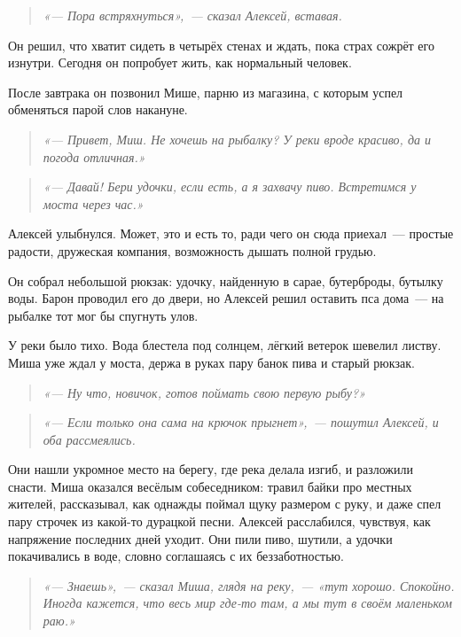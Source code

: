 \documentclass[12pt,a4paper]{book}
\newenvironment{dialogue}{\begin{quote}\itshape}{\end{quote}} %
\begin{document}
\begin{dialogue}
«--- Пора встряхнуться»,~--- сказал Алексей, вставая.
\end{dialogue}

Он решил, что хватит сидеть в четырёх стенах и ждать, пока страх сожрёт его изнутри. Сегодня он попробует жить, как нормальный человек.

После завтрака он позвонил Мише, парню из магазина, с которым успел обменяться парой слов накануне.

\begin{dialogue}
«--- Привет, Миш. Не хочешь на рыбалку? У реки вроде красиво, да и погода отличная.»
\end{dialogue}

\begin{dialogue}
«--- Давай! Бери удочки, если есть, а я захвачу пиво. Встретимся у моста через час.»
\end{dialogue}

Алексей улыбнулся. Может, это и есть то, ради чего он сюда приехал~--- простые радости, дружеская компания, возможность дышать полной грудью.

Он собрал небольшой рюкзак: удочку, найденную в сарае, бутерброды, бутылку воды. Барон проводил его до двери, но Алексей решил оставить пса дома~--- на рыбалке тот мог бы спугнуть улов.

У реки было тихо. Вода блестела под солнцем, лёгкий ветерок шевелил листву. Миша уже ждал у моста, держа в руках пару банок пива и старый рюкзак.

\begin{dialogue}
«--- Ну что, новичок, готов поймать свою первую рыбу?»
\end{dialogue}

\begin{dialogue}
«--- Если только она сама на крючок прыгнет»,~--- пошутил Алексей, и оба рассмеялись.
\end{dialogue}

Они нашли укромное место на берегу, где река делала изгиб, и разложили снасти. Миша оказался весёлым собеседником: травил байки про местных жителей, рассказывал, как однажды поймал щуку размером с руку, и даже спел пару строчек из какой-то дурацкой песни. Алексей расслабился, чувствуя, как напряжение последних дней уходит. Они пили пиво, шутили, а удочки покачивались в воде, словно соглашаясь с их беззаботностью.

\begin{dialogue}
«--- Знаешь»,~--- сказал Миша, глядя на реку,~--- «тут хорошо. Спокойно. Иногда кажется, что весь мир где-то там, а мы тут в своём маленьком раю.»
\end{dialogue}
\end{document}
